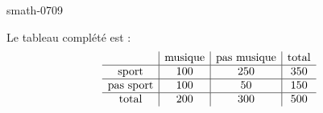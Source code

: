 
\begin{corrige}{smath-0709}

    Le tableau complété est :
    \begin{equation*}
        \begin{array}[]{c|c|c|c}
            &\text{musique}&\text{pas musique}&\text{total}\\
            \hline
            \text{sport}&100&250&350\\
            \hline
            \text{pas sport}&100&50&150\\
            \hline
            \text{total}&200&300&500\\
        \end{array}
    \end{equation*}

\end{corrige}
